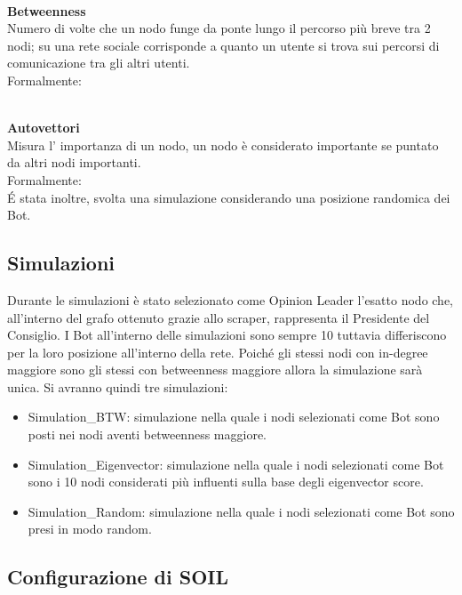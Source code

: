     \\
    \textbf{Betweenness}
    \\
    Numero di volte che un nodo funge da ponte lungo il percorso più breve tra 2 nodi; su una rete sociale corrisponde a quanto un utente si trova sui percorsi di comunicazione tra gli altri utenti.\\
    Formalmente:

    \\
    \textbf{Autovettori}
    \\
    Misura l' importanza di un nodo, un nodo è considerato importante se puntato da altri nodi importanti. \\
    Formalmente:
    \\
    É stata inoltre, svolta una simulazione considerando una posizione randomica dei Bot.

    \subsection{Simulazioni}
    Durante le simulazioni è stato selezionato come Opinion Leader l’esatto nodo che, all’interno del grafo ottenuto grazie allo scraper, rappresenta il Presidente del Consiglio. I Bot all’interno delle simulazioni sono sempre 10 tuttavia differiscono per la loro posizione all’interno della rete. Poiché gli stessi nodi con in-degree maggiore sono gli stessi con betweenness maggiore allora la simulazione sarà unica. Si avranno quindi tre simulazioni:
    \begin{itemize}
    \item Simulation_BTW: simulazione nella quale i nodi selezionati come Bot sono posti nei nodi aventi betweenness maggiore.
    \item Simulation_Eigenvector: simulazione nella quale i nodi selezionati come Bot sono i 10 nodi considerati più influenti sulla base degli eigenvector score.
    \item Simulation_Random: simulazione nella quale i nodi selezionati come Bot sono presi in modo random.
    \end{itemize}
    \subsection{Configurazione di SOIL}

